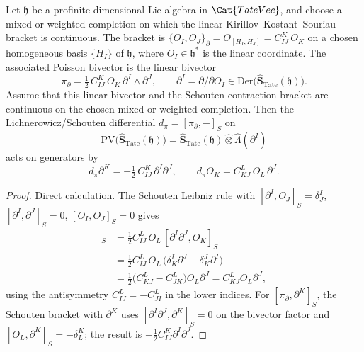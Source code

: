 \documentclass[11pt]{memoir}
\begin{document}
\begin{lem}\label{lem:linear-poisson-schouten}
  Let $\mathfrak h$ be a profinite-dimensional Lie algebra in
  $\Cat{TateVec}$, and choose a mixed or weighted completion on which the
  linear Kirillov--Kostant--Souriau bracket is continuous.  The bracket is
  $\{O_I,O_J\}_\partial=O_{[H_I,H_J]}=C^K_{IJ}\,O_K$ on a chosen
  homogeneous basis $\{H_I\}$ of $\mathfrak h$, where
  $O_I\in\mathfrak h^*$ is the linear coordinate. The associated
  Poisson bivector is the linear bivector
  $$\pi_\partial=\tfrac12\,C^K_{IJ}\,O_K\,\partial^I\wedge\partial^J,
    \qquad \partial^I=\partial/\partial O_I\in\mathrm{Der}\bigl(
    \widehat{\mathbf S}_{\mathrm{Tate}}(\mathfrak h)\bigr).$$
  Assume that this linear bivector and the Schouten contraction bracket
  are continuous on the chosen mixed or weighted completion.  Then the
  Lichnerowicz/Schouten differential
  $d_\pi=[\pi_\partial,-]_S$ on
  $$\mathrm{PV}\bigl(\widehat{\mathbf S}_{\mathrm{Tate}}(\mathfrak h)\bigr)=
    \widehat{\mathbf S}_{\mathrm{Tate}}(\mathfrak h)\widehat\otimes
    \widehat\Lambda(\partial^I)$$
  acts on generators by
  $$d_\pi\partial^K=-\tfrac12\,C^K_{IJ}\,\partial^I\partial^J,\qquad
    d_\pi O_K=C^L_{KJ}\,O_L\,\partial^J.$$
\end{lem}

\begin{proof}
  Direct calculation. The Schouten Leibniz rule with
  $[\partial^I,O_J]_S=\delta^I_J$, $[\partial^I,\partial^J]_S=0$,
  $[O_I,O_J]_S=0$ gives
  \begin{align*}
    [\pi_\partial,O_K]_S
    &=\tfrac12 C^L_{IJ}\,O_L\,[\partial^I\partial^J,O_K]_S\\
    &=\tfrac12 C^L_{IJ}\,O_L\,
      \bigl(\delta^I_K\partial^J-\delta^J_K\partial^I\bigr)\\
    &=\tfrac12\bigl(C^L_{KJ}-C^L_{JK}\bigr)O_L\partial^J
     =C^L_{KJ}O_L\partial^J,
  \end{align*}
  using the antisymmetry $C^L_{IJ}=-C^L_{JI}$ in the lower indices.
  For $[\pi_\partial,\partial^K]_S$, the Schouten bracket with
  $\partial^K$ uses
  $[\partial^I\partial^J,\partial^K]_S=0$ on the bivector factor and
  $[O_L,\partial^K]_S=-\delta^K_L$; the result is
  $-\tfrac12 C^K_{IJ}\partial^I\partial^J$.
\end{proof}
\end{document}
